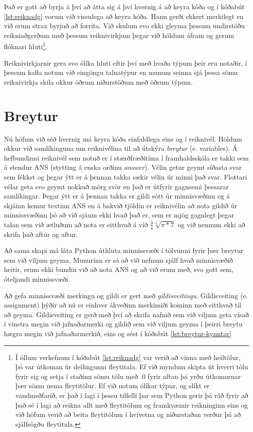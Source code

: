 Það er gott að byrja á því að átta sig á því hvernig á að keyra kóða og í kóðabút \ref{lst:reiknadg} vorum við vissulega að keyra kóða.
Hann gerði ekkert merkilegt en við erum strax byrjuð að forrita.
Við skulum svo ekki gleyma þessum undirstöðu reikniaðgerðum með þessum reiknivirkjum þegar við höldum áfram og gerum flóknari hluti\footnote{
	Í öllum verkefnum í kóðabút \ref{lst:reiknadg} var verið að vinna með heiltölur, þó var útkoman úr deilingunni fleytitala. 
	Ef við myndum skipta út hverri tölu fyrir sig og setja í staðinn sömu tölu með .0 fyrir aftan þá yrðu útkomurnar þær sömu nema fleytitölur. 
	Ef við notum ólíkar týpur, og slíkt er vandmeðfarið, er það í lagi í þessu tilfelli þar sem Python gerir þá ráð fyrir að það sé í lagi að reikna allt með fleytitölum og framkvæmir reikninginn eins og við höfum verið að beita fleytitölum í hvívetna og niðurstaðan verður þá að sjálfsögðu fleytitala.
}.

Reiknivirkjarnir gera svo ólíka hluti eftir því með hvaða týpum þeir eru notaðir, í þessum kafla notum við eingöngu talnatýpur en munum seinna sjá þessa sömu reiknivirkja skila okkur öðrum niðurstöðum með öðrum týpum.

\section{Breytur}
Nú höfum við séð hvernig má keyra kóða einfaldlega eins og í reiknivél.
Höldum okkur við samlíkinguna um reiknivélina til að útskýra \emph{breytur} (e. variables).
Á hefbundinni reiknivél sem notuð er í stærðfræðitíma í framhaldsskóla er takki sem á stendur ANS (stytting á enska orðinu \textit{answer}).
Vélin getur geymt síðasta svar sem fékkst og þegar ýtt er á þennan takka sækir vélin úr minni það svar.
Flottari vélar geta svo geymt nokkuð mörg svör en það er útfyrir gagnsemi þessarar samlíkingar.
Þegar ýtt er á þennan takka er gildi sótt úr minnisvæðinu og á skjáinn kemur textinn ANS en á bakvið tjöldin er reiknivélin að nota gildið úr minnissvæðinu þó að við sjáum ekki hvað það er, sem er mjög gagnlegt þegar talan sem við ætluðum að nota er eitthvað á við $\frac{3}{4}\sqrt[3]{\pi*7} $ og við nennum ekki að skrifa það aftur og aftur.

Að sama skapi má láta Python úthluta minnissvæði í tölvunni fyrir þær breytur sem við viljum geyma.
Munurinn er sá að við nefnum sjálf hvað minnisvæðið heitir, erum ekki bundin við að nota ANS og að við erum með, svo gott sem, óteljandi minnissvæði.

Að gefa minnissvæði merkingu og gildi er gert með \textit{gildisveitingu}.
Gildisveiting (e. assignment) þýðir að nú er einhver ákveðinn merkimiði kominn með eitthvað til að geyma.
Gildisveiting er gerð með því að skrifa nafnið sem við viljum geta vísað í vinstra megin við jafnaðarmerki og gildið sem við viljum geyma í þeirri breytu hægra megin við jafnaðarmerkið, eins og sést í kóðabút \ref{lst:breytur-kynntar}

